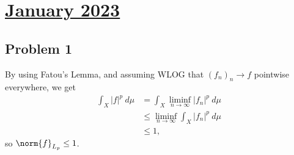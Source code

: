 \documentclass[10pt]{mypackage}
\begin{document}
\section{\href{https://math.virginia.edu/graduate/exams/analysis/2023Jan_real.pdf}{January 2023}}%
\subsection{Problem 1}%
By using Fatou's Lemma, and assuming WLOG that $\left( f_n \right)_n\rightarrow f$ pointwise everywhere, we get
\begin{align*}
  \int_{X}^{} \left\vert f \right\vert^{p}\:d\mu &= \int_{X}^{} \liminf_{n\rightarrow\infty} \left\vert f_n \right\vert^{p}\:d\mu\\
                                                 &\leq \liminf_{n\rightarrow\infty} \int_{X}^{} \left\vert f_n \right\vert^{p}\:d\mu\\
                                                 &\leq 1,
\end{align*}
so $\norm{f}_{L_p}\leq 1$.
\end{document}
